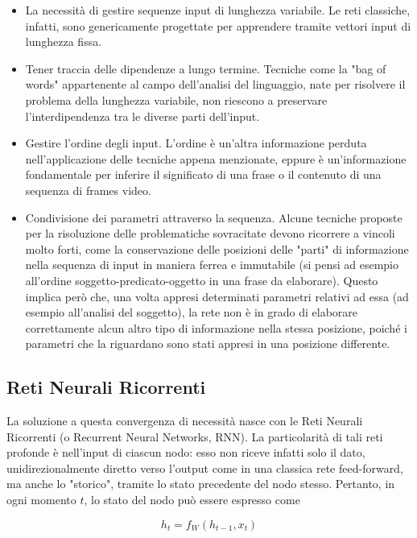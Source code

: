 \documentclass[10pt,letterpaper]{article}
\begin{document}
\begin{itemize}
\item La necessità di gestire sequenze input di lunghezza variabile. Le reti classiche, infatti, sono genericamente progettate per apprendere tramite vettori input di lunghezza fissa.
\item Tener traccia delle dipendenze a lungo termine. Tecniche come la "bag of words" appartenente al campo dell'analisi del linguaggio, nate per risolvere il problema della lunghezza variabile, non riescono a preservare l'interdipendenza tra le diverse parti dell'input.
\item Gestire l'ordine degli input. L'ordine è un'altra informazione perduta nell'applicazione delle tecniche appena menzionate, eppure è un'informazione fondamentale per inferire il significato di una frase o il contenuto di una sequenza di frames video.
\item Condivisione dei parametri attraverso la sequenza. Alcune tecniche proposte per la risoluzione delle problematiche sovracitate devono ricorrere a vincoli molto forti, come la conservazione delle posizioni delle "parti" di informazione nella sequenza di input in maniera ferrea e immutabile (si pensi ad esempio all'ordine soggetto-predicato-oggetto in una frase da elaborare). Questo implica però che, una volta appresi determinati parametri relativi ad essa (ad esempio all'analisi del soggetto), la rete non è in grado di elaborare correttamente alcun altro tipo di informazione nella stessa posizione, poiché i parametri che la riguardano sono stati appresi in una posizione differente.
\end{itemize}

\subsection{Reti Neurali Ricorrenti}

La soluzione a questa convergenza di necessità nasce con le Reti Neurali Ricorrenti (o Recurrent Neural Networks, RNN). La particolarità di tali reti profonde è nell'input di ciascun nodo: esso non riceve infatti solo il dato, unidirezionalmente diretto verso l'output come in una classica rete feed-forward, ma anche lo "storico", tramite lo stato precedente del nodo stesso. Pertanto, in ogni momento $t$, lo stato del nodo può essere espresso come

\begin{equation}
h_t = f_W(h_{t-1}, x_t)
\end{equation}
\end{document}
